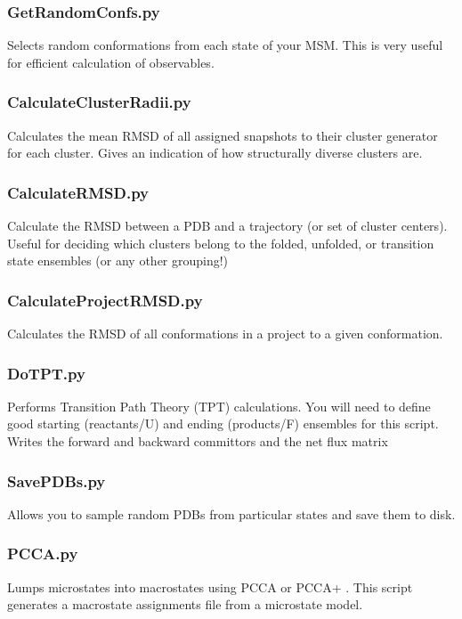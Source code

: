 \documentclass[12pt]{article}
\begin{document}
\subsubsection{GetRandomConfs.py}
Selects random conformations from each state of your MSM. This is very useful for efficient calculation of observables.

\subsubsection{CalculateClusterRadii.py}
Calculates the mean RMSD of all assigned snapshots to their cluster generator for each cluster. Gives an indication of how structurally diverse clusters are.

\subsubsection{CalculateRMSD.py}
Calculate the RMSD between a PDB and a trajectory (or set of cluster centers). Useful for deciding which clusters belong to the folded, unfolded, or transition state ensembles (or any other grouping!)

\subsubsection{CalculateProjectRMSD.py}
Calculates the RMSD of all conformations in a project to a given conformation.

\subsubsection{DoTPT.py}
Performs Transition Path Theory (TPT) calculations. You will need to define good starting (reactants/U) and ending (products/F) ensembles for this script. Writes the forward and backward committors and the net flux matrix

\subsubsection{SavePDBs.py}
Allows you to sample random PDBs from particular states and save them to disk.

\subsubsection{PCCA.py}
Lumps microstates into macrostates using PCCA \cite{Deuflhard2000} or PCCA+ \cite{Deuflhard2005, kube2007coarse}. This script generates a macrostate assignments file from a microstate model.  
\end{document}
